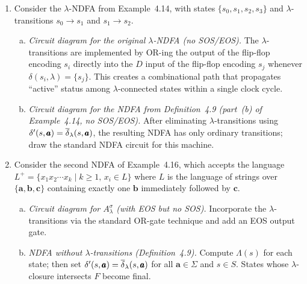 \begin{enumerate}[{4.}1.]
\begin{enumerate}[(a)]
  \item \emph{Is this DFA isomorphic to any of those in Exercise~4.4?}
  Yes.  Both Example~4.2 and Example~4.3 accept the same language $L$.
  The minimal DFA for $L$ is unique up to isomorphism (by
  Theorem~3.8).  After minimizing the DFA obtained in part~(c) and the
  DFA obtained in Exercise~4.4(b), both must produce the same minimal
  machine (up to renaming of states).  Hence they are isomorphic.
\end{enumerate}

\item Consider the $\lambda$-NDFA from Example~4.14, with states
$\{s_0,s_1,s_2,s_3\}$ and $\lambda$-transitions $s_0\to s_1$ and $s_1\to s_2$.

\begin{enumerate}[(a)]
  \item \emph{Circuit diagram for the original $\lambda$-NDFA (no SOS/EOS).}
  The $\lambda$-transitions are implemented by OR-ing the output of
  the flip-flop encoding $s_i$ directly into the $D$ input of the
  flip-flop encoding $s_j$ whenever $\delta(s_i,\lambda)=\{s_j\}$.
  This creates a combinational path that propagates ``active'' status
  among $\lambda$-connected states within a single clock cycle.

  \item \emph{Circuit diagram for the NDFA from Definition~4.9 (part~(b) of
  Example~4.14, no SOS/EOS).}  After eliminating $\lambda$-transitions using
  $\delta'(s,\pmb{a})=\overline{\delta}_\lambda(s,\pmb{a})$, the resulting NDFA has only
  ordinary transitions; draw the standard NDFA circuit for this machine.
\end{enumerate}

\item Consider the second NDFA of Example~4.16, which accepts the language
$L^+=\{x_1 x_2\cdots x_k\mid k\ge 1,\, x_i\in L\}$ where $L$ is the language
of strings over $\{\pmb{a},\pmb{b},\pmb{c}\}$ containing exactly one $\pmb{b}$
immediately followed by $\pmb{c}$.

\begin{enumerate}[(a)]
  \item \emph{Circuit diagram for $A^{\sigma}_\lambda$ (with EOS but no SOS).}
  Incorporate the $\lambda$-transitions via the standard OR-gate technique
  and add an EOS output gate.

  \item \emph{NDFA without $\lambda$-transitions (Definition~4.9).}
  Compute $\Lambda(s)$ for each state; then set
  $\delta'(s,\pmb{a})=\overline{\delta}_\lambda(s,\pmb{a})$ for all $\pmb{a}\in\Sigma$
  and $s\in S$.  States whose $\lambda$-closure intersects $F$ become final.


\end{enumerate}
\end{enumerate}
